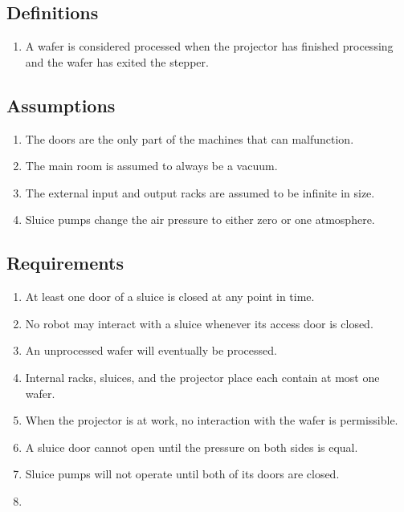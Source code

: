 \subsection{Definitions}
\begin{enumerate}
  \item A wafer is considered processed when the projector has finished processing and the wafer has exited the stepper.
\end{enumerate}

\subsection{Assumptions}
\begin{enumerate}
  \item The doors are the only part of the machines that can malfunction.
  \item The main room is assumed to always be a vacuum.
  \item The external input and output racks are assumed to be infinite in size.
  \item Sluice pumps change the air pressure to either zero or one atmosphere.
\end{enumerate}

\subsection{Requirements}
\begin{enumerate}
  \item At least one door of a sluice is closed at any point in time.
  \item No robot may interact with a sluice whenever its access door is closed.
  \item An unprocessed wafer will eventually be processed.
  \item Internal racks, sluices, and the projector place each contain at most one wafer.
  \item When the projector is at work, no interaction with the wafer is permissible.
  \item A sluice door cannot open until the pressure on both sides is equal.
  \item Sluice pumps will not operate until both of its doors are closed.
  \item {}
\end{enumerate}